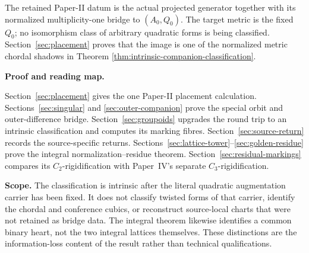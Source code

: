 \documentclass[11pt]{article}
\theoremstyle{definition}
\theoremstyle{remark}
\begin{document}
The retained Paper-II datum is the actual projected generator together with
its normalized multiplicity-one bridge to \((A_0,Q_0)\).  The target metric is
the fixed \(Q_0\); no isomorphism class of arbitrary quadratic forms is being
classified.  Section~\ref{sec:placement} proves that the image is one of the
normalized metric chordal shadows in Theorem
\ref{thm:intrinsic-companion-classification}.

\medskip
\noindent\textbf{Proof and reading map.}
\begin{center}
\footnotesize
{}
\end{center}

Section~\ref{sec:placement} gives the one Paper-II placement calculation.
Sections~\ref{sec:singular} and \ref{sec:outer-companion} prove the special
orbit and outer-difference bridge.  Section~\ref{sec:groupoids} upgrades the
round trip to an intrinsic classification and computes its marking fibres.
Section~\ref{sec:source-return} records the source-specific returns.
Sections~\ref{sec:lattice-tower}--\ref{sec:golden-residue} prove the integral
normalization--residue theorem.  Section~\ref{sec:residual-markings} compares
its \(C_2\)-rigidification with Paper~IV's separate \(C_3\)-rigidification.

\medskip
\noindent\textbf{Scope.}
The classification is intrinsic after the literal quadratic augmentation
carrier has been fixed.  It does not classify twisted forms of that carrier,
identify the chordal and conference cubics, or reconstruct source-local charts
that were not retained as bridge data.  The integral theorem likewise
identifies a common binary heart, not the two integral lattices themselves.
These distinctions are the information-loss content of the result rather than
technical qualifications.
\end{document}

